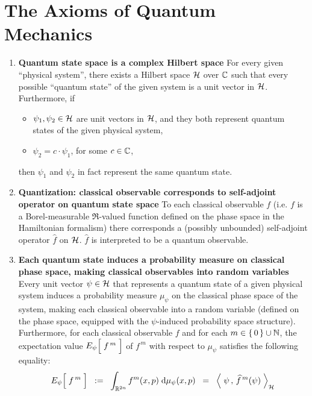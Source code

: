 

\section{The Axioms of Quantum Mechanics}
\setcounter{theorem}{0}
\setcounter{equation}{0}


\renewcommand{\theenumi}{\roman{enumi}}
\renewcommand{\labelenumi}{\textnormal{(\theenumi)}$\;\;$}


\begin{enumerate}
\item
	\textbf{Quantum state space is a complex Hilbert space}
	\vskip 0.05cm
	For every given ``physical system'', there exists a Hilbert space $\mathcal{H}$ over $\mathbb{C}$
	such that every possible ``quantum state'' of the given system is a unit vector in $\mathcal{H}$.
	Furthermore, if
	\begin{itemize}
	\item
		$\psi_{1}, \psi_{2} \in \mathcal{H}$ are unit vectors in $\mathcal{H}$, and they both represent quantum states of the given physical system,
	\item
		$\psi_{2} = c \cdot \psi_{1}$, for some $c \in \mathbb{C}$,
	\end{itemize}
	then $\psi_{1}$ and $\psi_{2}$ in fact represent the same quantum state.

\vskip 0.5cm
\item
	\textbf{Quantization: classical observable corresponds to self-adjoint operator on quantum state space}
	\vskip 0.05cm
	To each classical observable $f$
	(i.e. $f$ is a Borel-measurable $\Re$-valued function defined on the phase space in the Hamiltonian formalism)
	there corresponds a (possibly unbounded) self-adjoint operator
	$\widehat{f}$ on $\mathcal{H}$.
	$\widehat{f}$ is interpreted to be a quantum observable.

\vskip 0.5cm
\item
	\textbf{Each quantum state induces a probability measure on classical phase space, making classical observables into random variables}
	\vskip 0.05cm
	Every unit vector $\psi \in \mathcal{H}$ that represents a quantum state of a given physical system
	induces a probability measure $\mu_{\psi}$ on the classical phase space of the system,
	making each classical observable into a random variable
	(defined on the phase space, equipped with the $\psi$-induced probability space structure).
	Furthermore, for each classical observable $f$ and for each $m \in \{\,0\,\}\cup\mathbb{N}$,
	the expectation value $E_{\psi}\!\left[\;\overset{{\color{white}.}}{f^{\,m}}\;\right]$ of $f^{\,m}$
	with respect to $\mu_{\psi}$ satisfies the following equality:
	\begin{equation*}
	E_{\psi}\!\left[\;\overset{{\color{white}.}}{f^{\,m}}\;\right]
	\;\; := \;\;
		\int_{\Re^{2n}}
		f^{m}(x,p)
		\;\d\mu_{\psi}(x,p)
	\;\; = \;\;
		\left\langle\;
			\psi
			\,,\,
			\widehat{f}^{\,m}(\psi)
			\;\right\rangle_{\H}
	\end{equation*}


\end{enumerate}
